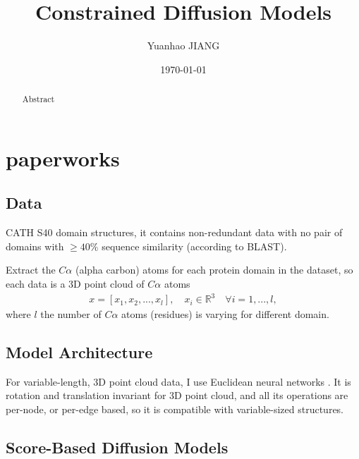 \documentclass[12pt]{report}
\title{Constrained Diffusion Models}
\date{\today}
\author{Yuanhao JIANG}
\begin{document}
\maketitle

\begin{abstract}
    Abstract
\end{abstract}

\tableofcontents
{}
\newpage
{}

\chapter{paperworks}
\section{Data}
CATH S40 domain structures, it contains non-redundant data with no pair of domains with \(\geq 40\%\) sequence similarity (according to BLAST).

Extract the \(C\alpha\) (alpha carbon) atoms for each protein domain in the dataset, so each data is a 3D point cloud of \(C\alpha\) atoms
\begin{align*}
    x = \left[x_1,x_2,...,x_l\right],\quad x_i\in\mathbb{R}^3\quad\forall i=1,...,l,
\end{align*}
where \(l\) the number of \(C\alpha\) atoms (residues) is varying for different domain.
\section{Model Architecture}
For variable-length, 3D point cloud data, I use Euclidean neural networks \cite{thomasTensorFieldNetworks2018,weiler3DSteerableCNNs2018,kondorClebschGordanNetsFully2018}. It is rotation and translation invariant for 3D point cloud, and all its operations are per-node, or per-edge based, so it is compatible with variable-sized structures.
\section{Score-Based Diffusion Models}
\end{document}
